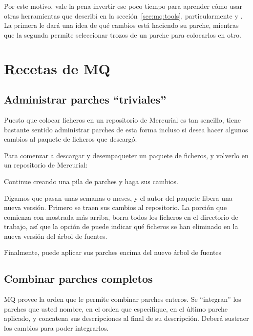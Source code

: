 Por este motivo, vale la pena invertir ese poco tiempo para aprender
cómo usar otras herramientas que describí en la
sección~\ref{sec:mq:tools}, particularmente  y
.  La primera le dará una idea de qué cambios está
haciendo su parche, mientras que la segunda permite seleccionar trozos
de un parche para colocarlos en otro.

\section{Recetas de MQ}

\subsection{Administrar parches ``triviales''}

Puesto que colocar ficheros en un repositorio de Mercurial es tan
sencillo, tiene bastante sentido administrar parches de esta forma
incluso si desea hacer algunos cambios al paquete de ficheros que
descargó.

Para comenzar a descargar y desempaqueter un paquete de ficheros, y
volverlo en un repositorio de Mercurial:

Continue creando una pila de parches y haga sus cambios.

Digamos que pasan unas semanas o meses, y el autor del paquete libera
una nueva versión.  Primero se traen sus cambios al repositorio.
La porción que comienza con  mostrada más arriba, borra
todos los ficheros en el directorio de trabajo, así que la opción
 de  puede indicar qué
ficheros se han eliminado en la nueva versión del árbol de fuentes.

Finalmente, puede aplicar sus parches encima del nuevo árbol de fuentes

\subsection{Combinar parches completos}
\label{sec:mq:combine}

MQ provee la orden  que le permite combinar parches
enteros.  Se ``integran'' los parches que usted nombre, en
el orden que especifique, en el último parche aplicado, y concatena
sus descripciones al final de su descripción.  Deberá sustraer los
cambios para poder integrarlos.

